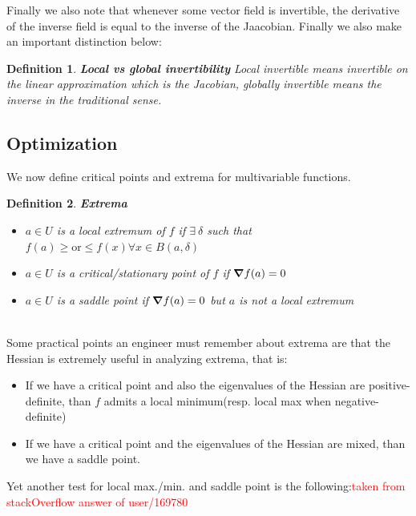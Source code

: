 \documentclass[titlepage]{article}
\newtheorem{definition}{Definition}
\begin{document}
Finally we also note that whenever some vector field is invertible, the derivative of the inverse field is equal to the inverse of the Jaacobian. Finally we also make an important distinction below:

\begin{definition} \textbf{Local vs global invertibility}
Local invertible means invertible on the linear approximation which is the Jacobian, globally invertible means the inverse in the traditional sense.
\end{definition}



\subsection{Optimization}
We now define critical points and extrema for multivariable functions.
\begin{definition}\textbf{Extrema}
\begin{itemize}
    \item $a \in U$ is a local extremum of $f$ if $\exists \  \delta $ such that $f(a) \geq \text{or} \leq f(x) \forall x \in B(a,\delta)$
    \item $a \in U$ is a critical/stationary point of $f$ if $\grad f(a) = 0$
    \item $a \in U$ is a saddle point if $\grad f(a) = 0$ but $a$ is not a local extremum
\end{itemize}

\end{definition}
\\

Some practical points an engineer must remember about extrema are that the Hessian is extremely useful in analyzing extrema, that is:

\begin{itemize}
    \item If we have a critical point and also the eigenvalues of the Hessian are positive-definite, than $f$ admits a local minimum(resp. local max when negative-definite)
    \item If we have a critical point and the eigenvalues of the Hessian are mixed, than we have a saddle point. 
\end{itemize}

Yet another test for local max./min. and saddle point is the following:\textcolor{red}{taken from stackOverflow answer of user/169780}
\\
\end{document}
